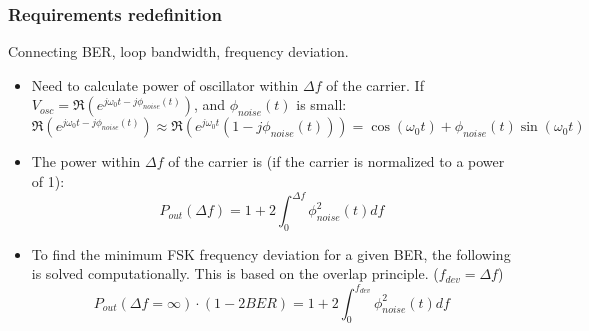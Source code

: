 \documentclass[t, screen, aspectratio=43]{beamer}
\begin{document}
\begin{frame}
	\frametitle{Requirements redefinition}
	\begin{block}{Connecting BER, loop bandwidth, frequency deviation.}
		\begin{itemize}
			\scriptsize
			\item  Need to calculate power of oscillator within $\Delta f$ of the carrier. If $V_{osc} = \Re\left(e^{j\omega_0t - j\phi_{noise}(t)}\right)$, and $\phi_{noise}(t)$ is small:
			\tiny
			\begin{equation}
				\Re\left(e^{j\omega_0t - j\phi_{noise}(t)}\right) \approx \Re\left(e^{j\omega_0t}(1-j\phi_{noise}(t))\right) = \cos(\omega_0t) + \phi_{noise}(t)\sin(\omega_0t)
			\end{equation}
			\scriptsize	
			\item  The power within $\Delta f$ of the carrier is (if the carrier is normalized to a power of 1):
			\tiny
			\begin{equation}
				P_{out}(\Delta f) = 1 + 2\int_0^{\Delta f}\phi_{noise}^2(t)df
			\end{equation}
			\scriptsize	
			\item To find the minimum FSK frequency deviation for a given BER, the following is solved computationally. This is based on the overlap principle. ($f_{dev}=\Delta f$)
			\tiny
			\begin{equation}
				P_{out}(\Delta f=\infty)\cdot(1-2BER) = 1 + 2\int_0^{f_{dev}}\phi_{noise}^2(t)df
			\end{equation}
		\end{itemize} 	
	\end{block}
\end{frame}
\end{document}
